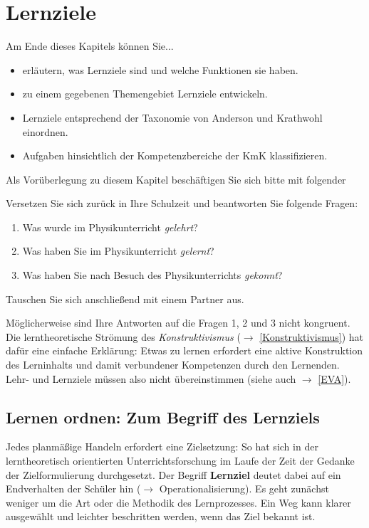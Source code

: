\chapter{Lernziele}\label{Lernziel}\label{Ziele}

\begin{ziele}
	Am Ende dieses Kapitels können Sie...
	\begin{itemize}
		\item erläutern, was Lernziele sind und welche Funktionen sie haben.
		\item zu einem gegebenen Themengebiet Lernziele entwickeln.
		\item Lernziele entsprechend der Taxonomie von Anderson und Krathwohl einordnen.
		\item Aufgaben hinsichtlich der Kompetenzbereiche der KmK klassifizieren.
	\end{itemize}	
\end{ziele}

Als Vorüberlegung zu diesem Kapitel beschäftigen Sie sich bitte mit folgender
\begin{uea}
	Versetzen Sie sich zurück in Ihre Schulzeit und beantworten Sie folgende Fragen:
	\begin{enumerate}
		\item Was wurde im Physikunterricht \emph{gelehrt}?
		\item Was haben Sie im Physikunterricht \emph{gelernt}?
		\item Was haben Sie nach Besuch des Physikunterrichts \emph{gekonnt}?
	\end{enumerate}
	Tauschen Sie sich anschließend mit einem Partner aus.	
\end{uea}

Möglicherweise sind Ihre Antworten auf die Fragen 1, 2 und 3 nicht kongruent. Die lerntheoretische Strömung des \emph{Konstruktivismus} ($\to$ \cref{Konstruktivismus}) hat dafür eine einfache Erklärung: Etwas zu lernen erfordert eine aktive Konstruktion des Lerninhalts und damit verbundener Kompetenzen durch den Lernenden. Lehr- und Lernziele müssen also nicht übereinstimmen (siehe auch $\to$ \cref{EVA}).

\section{Lernen ordnen: Zum Begriff des Lernziels}
Jedes planm\"{a}{\ss}ige Handeln erfordert eine Zielsetzung:
So hat sich in der lerntheoretisch orientierten Unterrichtsforschung im Laufe der Zeit der Gedanke
der Zielformulierung durchgesetzt.
\mip
Der Begriff {\bf Lernziel} deutet dabei auf ein Endverhalten
der Sch\"{u}ler hin ($\to$ Operationalisierung). Es geht zun\"{a}chst weniger um die Art oder die Methodik
des Lernprozesses.
\mip
Ein Weg kann klarer ausgew\"{a}hlt und leichter beschritten werden,
wenn das Ziel bekannt ist.

